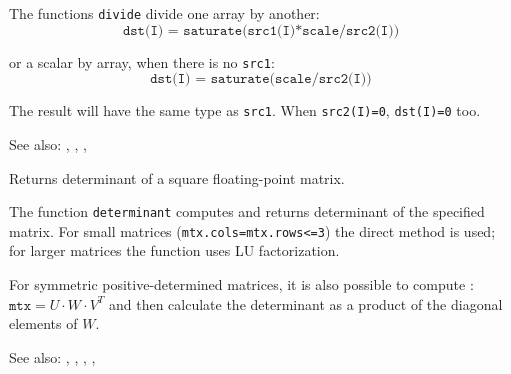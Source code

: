 \begin{description}
\end{description}

The functions \texttt{divide} divide one array by another:
\[\texttt{dst(I) = saturate(src1(I)*scale/src2(I))} \]

or a scalar by array, when there is no \texttt{src1}:
\[\texttt{dst(I) = saturate(scale/src2(I))} \]

The result will have the same type as \texttt{src1}. When \texttt{src2(I)=0}, \texttt{dst(I)=0} too.

See also: , , , 


Returns determinant of a square floating-point matrix.

\begin{description}
\end{description}

The function \texttt{determinant} computes and returns determinant of the specified matrix. For small matrices (\texttt{mtx.cols=mtx.rows<=3})
the direct method is used; for larger matrices the function uses LU factorization.

For symmetric positive-determined matrices, it is also possible to compute : $\texttt{mtx}=U \cdot W \cdot V^T$ and then calculate the determinant as a product of the diagonal elements of $W$.

See also: , , , , 

